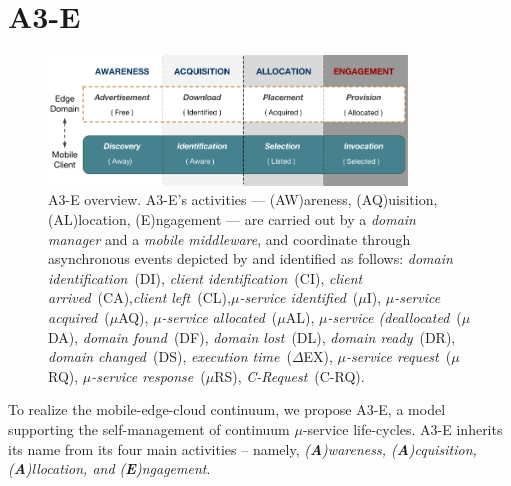\section{A3-E}\label{sec:A3-E}


\begin{figure}[tbp]
	\includegraphics[width=0.85\textwidth]{figs/A3-E}
	\caption{A3-E overview. A3-E's activities --- (AW)areness, (AQ)uisition, (AL)location, (E)ngagement --- are carried out by a \textit{domain manager} and a \textit{mobile middleware}, and coordinate through asynchronous events depicted by and identified as follows: \textit{domain identification}~(DI), \textit{client identification}~(CI), \textit{client arrived}~(CA),\textit{client left}~(CL),\textit{$\mu$-service identified}~($\mu$I), \textit{$\mu$-service acquired}~($\mu$AQ), \textit{$\mu$-service allocated}~($\mu$AL), \textit{$\mu$-service (deallocated}~($\mu$DA), \textit{domain found}~(DF), \textit{domain lost}~(DL), \textit{domain ready}~(DR), \textit{domain changed}~(DS), \textit{execution time}~($\Delta$EX), \textit{$\mu$-service request}~($\mu$RQ), \textit{$\mu$-service response}~($\mu$RS), \textit{C-Request}~(C-RQ).}
	\label{fig:A3-E-process}
\end{figure}


To realize the mobile-edge-cloud continuum, we propose A3-E, a model supporting the self-management of continuum $\mu$-service life-cycles. A3-E inherits its name from its four main activities -- namely, \textit{(\textbf{A})wareness, (\textbf{A})cquisition, (\textbf{A})llocation, and (\textbf{E})ngagement}. 

